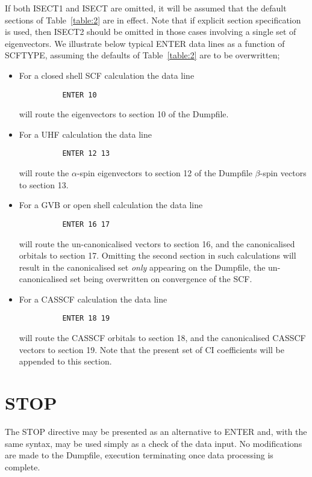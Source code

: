 \documentclass[11pt,fleqn]{article}
\begin{document}
If both ISECT1 and ISECT are omitted, it will be assumed that the
default sections of Table~\ref{table:2} are in effect. Note that if
explicit section specification is used, then ISECT2 should be omitted
in those cases involving a single set of eigenvectors. We illustrate
below typical ENTER data lines as a function of SCFTYPE, assuming the
defaults of Table~\ref{table:2} are to be overwritten;

\begin{itemize}
\item For a closed shell SCF calculation the data line
{
\footnotesize
\begin{verbatim}
          ENTER 10     
\end{verbatim}
}
will route the eigenvectors to section 10 of the Dumpfile.
\item For a UHF calculation the data line
{
\footnotesize
\begin{verbatim}
          ENTER 12 13
\end{verbatim}
}
will route the $\alpha$-spin eigenvectors to section 12 of the Dumpfile
$\beta$-spin vectors  to section 13.
\item For a GVB or open shell calculation the data line
{
\footnotesize
\begin{verbatim}
          ENTER 16 17
\end{verbatim}
}
will  route the un-canonicalised vectors to section 16, and the
canonicalised orbitals to section 17. Omitting the second section
in such calculations will result in the canonicalised set {\em only}
appearing on the Dumpfile, the un-canonicalised set being overwritten
on convergence of the SCF.
\item For a CASSCF calculation the data line
{
\footnotesize
\begin{verbatim}
          ENTER 18 19
\end{verbatim}
}
will route the CASSCF orbitals to section 18, and the canonicalised CASSCF
vectors to section 19. Note that the present set of CI coefficients will
be appended to this section.
\end{itemize}


\section[STOP]{STOP}

The STOP directive may be presented as an alternative to ENTER and, 
with the same syntax, may be used simply as a check of the 
data input. No modifications
are made to the Dumpfile, execution terminating once data processing
is complete.
\end{document}
